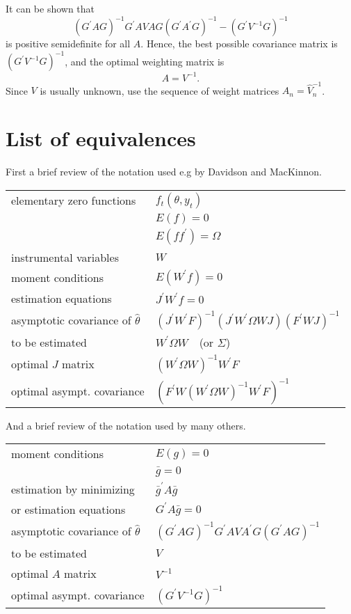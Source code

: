 \documentclass{article}
\begin{document}
It can be shown that%
\begin{equation*}
(G^{\prime }AG)^{-1}G^{\prime }AVAG(G^{\prime }A^{\prime }G)^{-1}-(G^{\prime
}V^{-1}G)^{-1}
\end{equation*}%
is positive semidefinite for all $A.$ Hence, the best possible covariance
matrix is $(G^{\prime }V^{-1}G)^{-1}$, and the optimal weighting matrix is
\begin{equation*}
A=V^{-1}.
\end{equation*}%
Since $V$ is usually unknown, use the sequence of weight matrices $A_{n}=%
\hat{V}_{n}^{-1}$.

\section{List of equivalences}

First a brief review of the notation used e.g by Davidson and MacKinnon.

\begin{center}
\begin{tabular}{ll}
elementary zero functions & $f_{t}\left( \theta ,y_{t}\right) $ \\
& $E(f)=0$ \\
& $E(ff^{\prime })=\Omega $ \\
instrumental variables & $W$ \\
moment conditions & $E(W^{\prime }f)=0$ \\
estimation equations & $J^{\prime }W^{\prime }f=0$ \\
asymptotic covariance of $\hat{\theta}$ & $\left( J^{\prime }W^{\prime
}F\right) ^{-1}\left( J^{\prime }W^{\prime }\Omega WJ\right) \left(
F^{\prime }WJ\right) ^{-1}$ \\
to be estimated & $W^{\prime }\Omega W\quad $(or $\Sigma $) \\
optimal $J$ matrix & $\left( W^{\prime }\Omega W\right) ^{-1}W^{\prime }F$
\\
optimal asympt. covariance & $\left( F^{\prime }W\left( W^{\prime }\Omega
W\right) ^{-1}W^{\prime }F\right) ^{-1}$%
\end{tabular}
\end{center}

And a brief review of the notation used by many others.

\begin{center}
\begin{tabular}{ll}
moment conditions & $E(g)=0$ \\
& $\bar{g}=0$ \\
estimation by minimizing & $\bar{g}^{\prime }A\bar{g}$ \\
or estimation equations & $G^{\prime }A\bar{g}=0$ \\
asymptotic covariance of $\hat{\theta}$ & $\left( G^{\prime }AG\right)
^{-1}G^{\prime }AVA^{\prime }G\left( G^{\prime }AG\right) ^{-1}$ \\
to be estimated & $V$ \\
optimal $A$ matrix & $V^{-1}$ \\
optimal asympt. covariance & $\left( G^{\prime }V^{-1}G\right) ^{-1}$%
\end{tabular}
\end{center}
\end{document}
